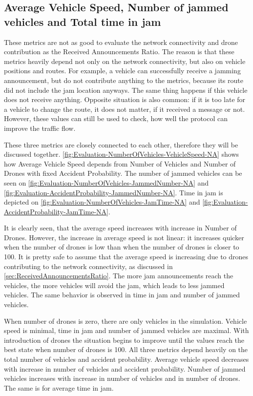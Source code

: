 \documentclass[]{nsm-thesis}
\begin{document}
\subsection{Average Vehicle Speed, Number of jammed vehicles and Total time in jam}

These metrics are not as good to evaluate the network connectivity and drone contribution as the Received Announcements Ratio. The reason is that these metrics heavily depend not only on the network connectivity, but also on vehicle positions and routes. For example, a vehicle can successfully receive a jamming announcement, but do not contribute anything to the metrics, because its route did not include the jam location anyways. The same thing happens if this vehicle does not receive anything. Opposite situation is also common: if it is too late for a vehicle to change the route, it does not matter, if it received a message or not. However, these values can still be used to check, how well the protocol can improve the traffic flow.

These three metrics are closely connected to each other, therefore they will be discussed together. \cref{fig:Evaluation-NumberOfVehicles-VehicleSpeed-NA} shows how Average Vehicle Speed depends from Number of Vehicles and Number of Drones with fixed Accident Probability. The number of jammed vehicles can be seen on \cref{fig:Evaluation-NumberOfVehicles-JammedNumber-NA} and \cref{fig:Evaluation-AccidentProbability-JammedNumber-NA}. Time in jam is depicted on \cref{fig:Evaluation-NumberOfVehicles-JamTime-NA} and \cref{fig:Evaluation-AccidentProbability-JamTime-NA}.

It is clearly seen, that the average speed increases with increase in Number of Drones. However, the increase in average speed is not linear: it increases quicker when the number of drones is low than when the number of drones is closer to 100. It is pretty safe to assume that the average speed is increasing due to drones contributing to the network connectivity, as discussed in \cref{sec:ReceivedAnnouncementsRatio}. The more jam announcements reach the vehicles, the more vehicles will avoid the jam, which leads to less jammed vehicles. The same behavior is observed in time in jam and number of jammed vehicles.

When number of drones is zero, there are only vehicles in the simulation. Vehicle speed is minimal, time in jam and number of jammed vehicles are maximal. With introduction of drones the situation begins to improve until the values reach the best state when number of drones is 100. All three metrics depend heavily on the total number of vehicles and accident probability. Average vehicle speed decreases with increase in number of vehicles and accident probability. Number of jammed vehicles increases with increase in number of vehicles and in number of drones. The same is for average time in jam.
\end{document}
